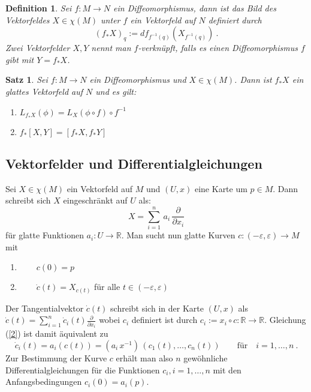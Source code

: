\documentclass[12pt,a4paper]{article}
\def\R{\mathbb{R}}
\newtheorem{Satz}[Lemma]{Satz}
\newtheorem{Definition}[Lemma]{Definition}
\begin{document}
\begin{Definition}
Sei $f:M\rightarrow N$ ein Diffeomorphismus, dann ist das Bild des Vektorfeldes $X\in \chi(M)$
unter $f$ ein Vektorfeld auf $N$ definiert durch
$$
(f_* X)_q := df_{f^{-1}(q)} (X_{f^{-1}(q)}) \ .
$$
Zwei Vektorfelder $X,Y$ nennt man $f$-verkn\"upft, falls es einen Diffeomorphismus
$f$ gibt mit $Y = f_* X$.
\end{Definition}


\begin{Satz}
Sei $f:M\rightarrow N$ ein Diffeomorphismus und $X\in \chi(M)$. Dann ist $f_* X$
ein glattes Vektorfeld auf $N$ und es gilt:
\begin{enumerate}
\item
$
L_{f_*X} (\phi ) = L_X(\phi \circ f) \circ f^{-1}
$
\item
$
f_* [X,Y] = [f_*X, f_*Y]
$
\end{enumerate}
\end{Satz}

\bigskip

\subsection{Vektorfelder und Differentialgleichungen}

\bigskip

Sei $X\in \chi(M)$ ein Vektorfeld auf $M$ und $(U,x)$ eine Karte um $p \in M$. Dann schreibt
sich $X$ eingeschr\"ankt auf $U$ als:
$$
X = \sum^n_{i=1}\, a_i \, \frac{\partial}{\partial x_i}
$$
f\"ur glatte Funktionen $a_i:U \rightarrow \R$. Man sucht nun  glatte Kurven
$c: (-\varepsilon, \varepsilon)\rightarrow M$ mit
\begin{enumerate}
\item
$\qquad c(0) = p$
\item\label{2}
$\qquad \dot c (t) = X_{c(t)}$ \qquad f\"ur alle $t\in (-\varepsilon, \varepsilon)$
\end{enumerate}

Der Tangentialvektor $\dot c (t)$ schreibt sich in der Karte $(U,x)$ als
$\dot c (t) = \sum^n_{i=1} \dot c_i (t) \frac{\partial}{\partial x_i}$ wobei
$c_i$ definiert ist durch $c_i:= x_i \circ c : \R\rightarrow \R$.
Gleichung (\ref{2}) ist damit \"aquivalent zu
$$
\dot c_i(t) = a_i(c(t)) =  (a_i \, x^{-1})\,(c_1(t),\ldots,c_n(t)) \qquad \mbox{f\"ur}\quad i=1,\ldots, n  \ .
$$
Zur Bestimmung der Kurve $c$ erh\"alt man also $n$ gew\"ohnliche Differentialgleichungen f\"ur die
Funktionen $c_i, i=1,\ldots, n$ mit den Anfangsbedingungen $c_i(0)=a_i(p)$.
\end{document}
